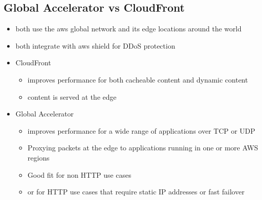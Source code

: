 \documentclass[]{scrartcl}
\begin{document}
\subsection{Global Accelerator vs CloudFront}

\begin{itemize}
	\item both use the aws global network and its edge locations around the world
	\item both integrate with aws shield for DDoS protection
	\item CloudFront
	\begin{itemize}
		\item improves performance for both cacheable content and dynamic content
		\item content is served at the edge
	\end{itemize}
	\item Global Accelerator
	\begin{itemize}
		\item improves performance for a wide range of applications over TCP or UDP
		\item Proxying packets at the edge to applications running in one or more AWS regions
		\item Good fit for non HTTP use cases
		\item or for HTTP use cases that require static IP addresses or fast failover
	\end{itemize}
\end{itemize}
\end{document}
